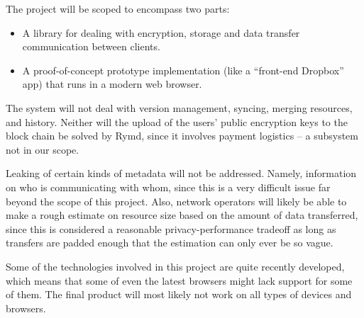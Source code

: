 The project will be scoped to encompass two parts:
\begin{itemize}
\item A library for dealing with encryption, storage and data transfer communication between clients.
\item A proof-of-concept prototype implementation (like a “front-end Dropbox” app) that runs in a modern web browser.
\end{itemize}
The system will not deal with version management, syncing, merging resources, and history. Neither will the upload of the users’ public encryption keys to the block chain be solved by Rymd, since it involves payment logistics – a subsystem not in our scope.

Leaking of certain kinds of metadata will not be addressed. Namely, information on who is communicating with whom, since this is a very difficult issue far beyond the scope of this project. Also, network operators will likely be able to make a rough estimate on resource size based on the amount of data transferred, since this is considered a reasonable privacy-performance tradeoff as long as transfers are padded enough that the estimation can only ever be so vague.

Some of the technologies involved in this project are quite recently developed, which means that some of even the latest browsers might lack support for some of them. The final product will most likely not work on all types of devices and browsers.

